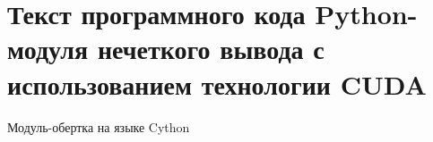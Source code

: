 \chapter{Текст программного кода Python-модуля нечеткого вывода с использованием технологии CUDA}\label{app:A}


\begingroup
\captiondelim{ } %
\begin{ListingEnv}
	\caption{Модуль-обертка на языке Cython}
	\label{lst:cython}
\end{ListingEnv}

